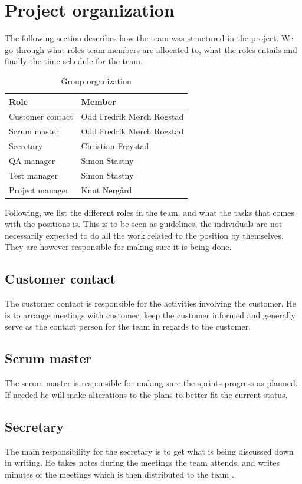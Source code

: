 \documentclass[11pt]{book}
\begin{document}
\section{Project organization}
The following section describes how the team was structured in the project. We go through what roles team members are allocated to, what the roles entails and finally the time schedule for the team.

\begin{table}[H]
\centering
\begin{tabular}{ l  p{11cm} }
Role & Member\\
\hline
Customer contact & Odd Fredrik Mørch Rogstad\\
\hline
Scrum master & Odd Fredrik Mørch Rogstad\\
\hline
Secretary & Christian Frøystad\\
\hline
QA manager & Simon Stastny\\
\hline
Test manager & Simon Stastny\\
\hline
Project manager & Knut Nergård\\
\end{tabular}
\label{tab:org}
\caption{Group organization}
\end{table}

Following, we list the different roles in the team, and what the tasks that comes with the positions is. This is to be seen as guidelines, the individuals are not necessarily expected to do all the work related to the position by themselves. They are however responsible for making sure it is being done.

\subsection{Customer contact}
The customer contact is responsible for the activities involving the customer. He is to arrange meetings with customer, keep the customer informed and generally serve as the contact person for the team in regards to the customer.

\subsection{Scrum master}
The scrum master is responsible for making sure the sprints progress as planned. If needed he will make alterations to the plans to better fit the current status.

\subsection{Secretary}
The main responsibility for the secretary is to get what is being discussed down in writing. He takes notes during the meetings the team attends, and writes minutes of the meetings which is then distributed to the team .
\end{document}
